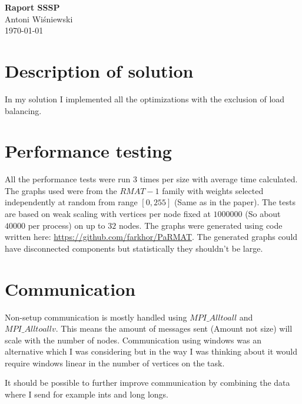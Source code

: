 \documentclass[a4paper,13pt,nontitlepage,onecolumn]{mwart}
\begin{document}
\Large\textbf{Raport SSSP}\\
\large{Antoni Wiśniewski}\\
\large{\today}

\large{
\vspace{.5cm}
\section{Description of solution}
In my solution I implemented all the optimizations with the exclusion of load balancing.

\section{Performance testing}
All the performance tests were run 3 times per size with average time calculated. The graphs used were from the $RMAT-1$ family with weights selected independently at random from range $[0, 255]$ (Same as in the paper). The tests are based on weak scaling with vertices per node fixed at $1000 000$ (So about $40 000$ per process) on up to $32$ nodes. The graphs were generated using code written here: \url{https://github.com/farkhor/PaRMAT}. The generated graphs could have disconnected components but statistically they shouldn't be large.
}

\section{Communication}
Non-setup communication is mostly handled using $MPI\_Alltoall$ and $MPI\_Alltoallv$. This means the amount of messages sent (Amount not size) will scale with the number of nodes. Communication using windows was an alternative which I was considering but in the way I was thinking about it would require windows linear in the number of vertices on the task.

It should be possible to further improve communication by combining the data where I send for example ints and long longs.
\end{document}
